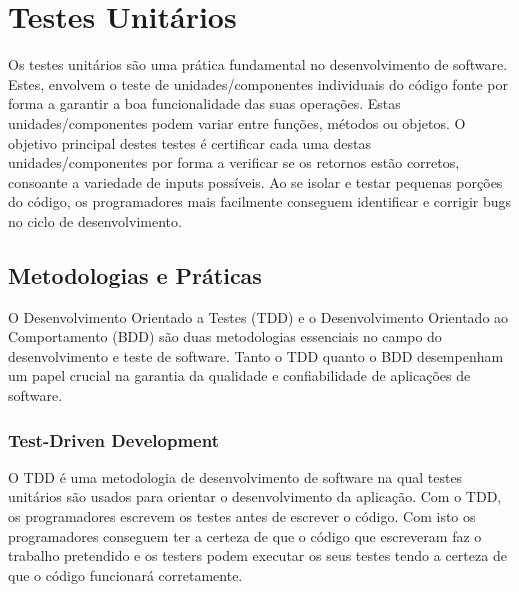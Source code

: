 \documentclass[a4paper,12pt]{article} %
\begin{document}
\newpage
\section{Testes Unitários}
Os testes unitários são uma prática fundamental no desenvolvimento de software. Estes, envolvem o teste de unidades/componentes individuais do código fonte por forma a garantir a boa funcionalidade das suas operações. Estas unidades/componentes podem variar entre funções, métodos ou objetos. O objetivo principal destes testes é certificar cada uma destas unidades/componentes por forma a verificar se os retornos estão corretos, consoante a variedade de inputs possíveis. Ao se isolar e testar pequenas porções do código, os programadores mais facilmente conseguem identificar e corrigir bugs no ciclo de desenvolvimento.

\subsection{Metodologias e Práticas}
O Desenvolvimento Orientado a Testes (TDD) e o Desenvolvimento Orientado ao Comportamento (BDD) são duas metodologias essenciais no campo do desenvolvimento e teste de software. Tanto o TDD quanto o BDD desempenham um papel crucial na garantia da qualidade e confiabilidade de aplicações de software.

\subsubsection{Test-Driven Development}
O TDD é uma metodologia de desenvolvimento de software na qual testes unitários são usados para orientar o desenvolvimento da aplicação. Com o TDD, os programadores escrevem os testes antes de escrever o código. Com isto os programadores conseguem ter a certeza de que o código que escreveram faz o trabalho pretendido e os testers podem executar os seus testes tendo a certeza de que o código funcionará corretamente.
\end{document}
